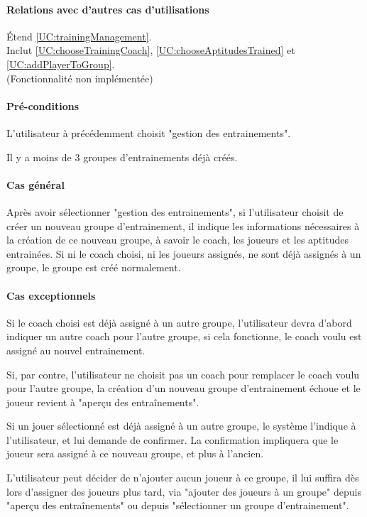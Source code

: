 \paragraph{Relations avec d'autres cas d'utilisations}
Étend \ref{UC:trainingManagement}.\\
Inclut \ref{UC:chooseTrainingCoach}, \ref{UC:chooseAptitudesTrained} et \ref{UC:addPlayerToGroup}.
\\(Fonctionnalité non implémentée)
\paragraph{Pré-conditions}
\begin{list}{}{\leftmargin=1.5em}
\item{L'utilisateur à précédemment choisit "gestion des entrainements".}
\item{Il y a moins de 3 groupes d'entrainements déjà créés.}
\end{list}
\paragraph{Cas général}
Après avoir sélectionner "gestion des entrainements", si l'utilisateur choisit de créer un nouveau groupe d'entrainement, il indique les informations nécessaires à la création de ce nouveau groupe, à savoir le coach, les joueurs et les aptitudes entrainées. Si ni le coach choisi, ni les joueurs assignés, ne sont déjà assignés à un groupe, le groupe est créé normalement.
\paragraph{Cas exceptionnels}
\begin{list}{}{\leftmargin=1.5em}
\item{Si le coach choisi est déjà assigné à un autre groupe, l'utilisateur devra d'abord indiquer un autre coach pour l'autre groupe, si cela fonctionne, le coach voulu est assigné au nouvel entrainement. }
\item{Si, par contre, l'utilisateur ne choisit pas un coach pour remplacer le coach voulu pour l'autre groupe, la création d'un nouveau groupe d'entrainement échoue et le joueur revient à "aperçu des entraînements". }
\item{Si un jouer sélectionné est déjà assigné à un autre groupe, le système l'indique à l'utilisateur, et lui demande de confirmer. La confirmation impliquera que le joueur sera assigné à ce nouveau groupe, et plus à l'ancien. }
\item{L'utilisateur peut décider de n'ajouter aucun joueur à ce groupe, il lui suffira dès lors d'assigner des joueurs plus tard, via "ajouter des joueurs à un groupe" depuis "aperçu des entraînements" ou depuis "sélectionner un groupe d'entrainement". }
\end{list}
